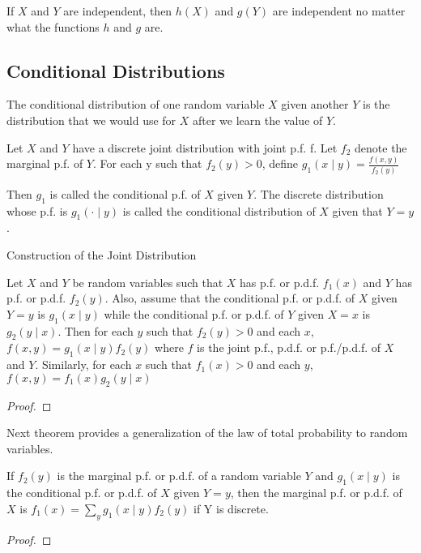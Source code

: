 {\color{red} If $X$ and $Y$ are independent, then $h\left(X\right)$ and $g\left(Y\right)$ are independent no matter what the functions $h$ and $g$ are.}


\subsection{Conditional Distributions}

{\color{red} The conditional distribution of one random variable $X$ given another $Y$ is the distribution that we would use for $X$ after we learn the value of $Y$.}

\begin{definition}
Let $X$ and $Y$ have a discrete joint distribution with joint p.f. f. Let $f_{2}$ denote the marginal p.f. of $Y$. For each y such that $f_{2}\left(y\right)>0$, define $g_{1}\left(x\mid y\right)=\frac{f\left(x,y\right)}{f_{2}\left(y\right)}$
\end{definition}

{\color{red} Then $g_{1}$ is called the conditional p.f. of $X$ given $Y$. The discrete distribution whose p.f. is $g_{1}\left(\cdot\mid y\right)$ is called the conditional distribution of $X$ given that $Y=y$.}

{\color{red} Construction of the Joint Distribution}

\begin{proposition}
Let $X$ and $Y$ be random variables such that $X$ has p.f. or p.d.f. $f_{1}\left(x\right)$ and $Y$ has p.f. or p.d.f. $f_{2}\left(y\right)$. Also, assume that the conditional p.f. or p.d.f. of $X$ given $Y=y$ is $g_{1}\left(x\mid y\right)$ while the conditional p.f. or p.d.f. of $Y$ given $X=x$ is $g_{2}\left(y\mid x\right)$. Then for each $y$ such that $f_{2}\left(y\right)>0$ and each $x$, $f\left(x,y\right)=g_{1}\left(x\mid y\right)f_{2}\left(y\right)$ where $f$ is the joint p.f., p.d.f. or p.f./p.d.f. of $X$ and $Y$. Similarly, for each $x$ such that $f_{1}\left(x\right)>0$ and each $y$, $f\left(x,y\right)=f_{1}\left(x\right)g_{2}\left(y\mid x\right)$
\end{proposition}
\begin{proof}
\end{proof}

{\color{red} Next theorem provides a generalization of the law of total probability to random variables.}

\begin{proposition}
If $f_{2}\left(y\right)$ is the marginal p.f. or p.d.f. of a random variable $Y$ and $g_{1}\left(x\mid y\right)$ is the conditional p.f. or p.d.f. of $X$ given $Y=y$, then the marginal p.f. or p.d.f. of $X$ is $f_{1}\left(x\right)=\sum_{y}g_{\text{1}}\left(x\mid y\right)f_{2}\left(y\right)$
if Y is discrete.
\end{proposition}
\begin{proof}
\end{proof}

